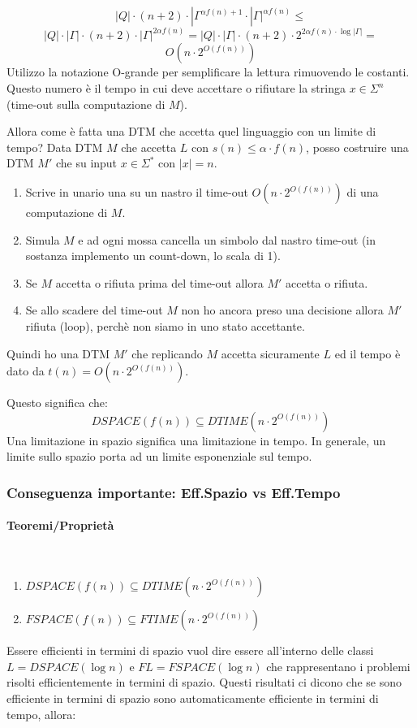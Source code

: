\documentclass{article}
\begin{document}
$$|Q|\cdot(n+2)\cdot|\Gamma^{\alpha f(n)+1}\cdot|\Gamma|^{\alpha f(n)}\leq$$
$$|Q|\cdot|\Gamma|\cdot(n+2)\cdot|\Gamma|^{2\alpha f(n)}=|Q|\cdot|\Gamma|\cdot(n+2)\cdot2^{2\alpha f(n)\cdot\log |\Gamma|}=$$
$$O(n\cdot 2^{O(f(n))})$$
Utilizzo la notazione O-grande per semplificare la lettura rimuovendo le costanti. Questo numero è
il tempo in cui deve accettare o rifiutare la stringa $x\in\Sigma^n$ (time-out sulla computazione di $M$).

Allora come è fatta una DTM che accetta quel linguaggio con un limite di tempo? Data DTM $M$ che accetta
$L$ con $s(n)\leq\alpha\cdot f(n)$, posso costruire una DTM $M'$ che su input $x\in\Sigma^*$ con $|x|=n$.
\begin{enumerate}
    \item Scrive in unario una su un nastro il time-out $O(n\cdot 2^{O(f(n))})$ di una computazione di $M$.
    \item Simula $M$ e ad ogni mossa cancella un simbolo dal nastro time-out (in
    sostanza implemento un count-down, lo scala di 1).
    \item Se $M$ accetta o rifiuta prima del time-out allora $M'$ accetta o rifiuta.
    \item Se allo scadere del time-out $M$ non ho ancora preso una decisione allora $M'$ rifiuta (loop),
    perchè non siamo in uno stato accettante.
\end{enumerate}
Quindi ho una DTM $M'$ che replicando $M$ accetta sicuramente $L$ ed il tempo è
dato da $t(n)=O(n\cdot 2^{O(f(n))})$.

Questo significa che:
$$DSPACE(f(n))\subseteq DTIME(n\cdot 2^{O(f(n))})$$
Una limitazione in spazio significa una limitazione in tempo. In generale, un limite sullo spazio porta
ad un limite esponenziale sul tempo.

\subsubsection{Conseguenza importante: Eff.Spazio vs Eff.Tempo}
\paragraph{Teoremi/Proprietà}\mbox{}\\
\begin{enumerate}
    \item $DSPACE(f(n))\subseteq DTIME(n\cdot 2^{O(f(n))})$
    \item $FSPACE(f(n))\subseteq FTIME(n\cdot 2^{O(f(n))})$
\end{enumerate}
Essere efficienti in termini di spazio vuol dire essere all'interno delle classi
$L=DSPACE(\log n)$ e $FL=FSPACE(\log n)$ che
rappresentano i problemi risolti efficientemente in termini di spazio.
Questi risultati ci dicono che se sono efficiente in termini di spazio sono automaticamente
efficiente in termini di tempo, allora:
\end{document}
